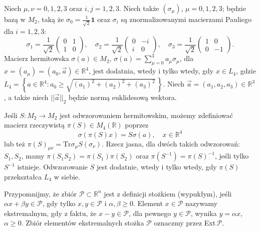 Niech $\mu,\nu = 0,1,2,3$ oraz $i,j = 1,2,3$.
Niech także $(\sigma_{\mu})$, $\mu = 0, 1, 2, 3$;
będzie bazą w  $M_{2}$, taką że
$\sigma_{0} = \tfrac{1}{\sqrt{2}}  \mathbf{1}$ oraz
$\sigma_{i}$
są znormalizowanymi macierzami Pauliego dla $i=1,2,3$:
\begin{equation}
 \sigma_{1} = \frac{1}{\sqrt{2}} \begin{pmatrix}
        0 & 1 \\ 1 & 0
           \end{pmatrix},
\quad
\sigma_{2} = \frac{1}{\sqrt{2}}  \begin{pmatrix}
        0 & -i \\ i & 0
           \end{pmatrix},
\quad
\sigma_{3} = \frac{1}{\sqrt{2}}  \begin{pmatrix}
        1 & 0 \\ 0 & -1
           \end{pmatrix}.
\end{equation}
Macierz hermitowska $\sigma(a) \in M_{2}$,
$\sigma(a) = \sum_{\mu =0}^{3} a_{\mu} \sigma_{\mu}$,
dla $x = (a_{\mu}) = (a_{0}, \vec{a}) \in \mathbb{R}^{4}$,
jest dodatnia, wtedy i tylko wtedy, gdy
$x \in L_{4}$,
gdzie
$ L_{4} = \left \{
            a \in \mathbb{R}^{4} :
            a_{0} \geq \sqrt{(a_{1})^{2} + (a_{2})^{2} + (a_{3})^{2}} \,
        \right \}$.
Niech $\vec{a} = (a_{1}, a_{2}, a_{3}) \in \mathbb{R}^{3}$,
a także niech $||\vec{a}||_{2}$ będzie normą euklidesową wektora.

Jeśli $S: M_{2} \rightarrow M_{2}$ jest odwzorowaniem hermitowskim,
możemy zdefiniować macierz rzeczywistą $\pi(S) \in M_{4}(\mathbb{R})$ poprzez
\begin{equation}
\label{def:PiofSiso}
  \sigma(\pi(S) x) = S \sigma(a), \quad x \in \mathbb{R}^{4}
\end{equation}
lub też $\pi(S)_{\mu \nu} = \text{Tr} \sigma_{\mu} S(\sigma_{\nu})$.
Rzecz jasna, dla dwóch takich odwzorowań: $S_{1}, S_{2}$, mamy
$\pi(S_{1} S_{2}) = \pi(S_{1}) \pi(S_{2})$
oraz $\pi(S^{-1}) = \pi(S)^{-1}$, jeśli tylko $S^{-1}$ istnieje.
Odwzorowanie $S$ jest dodatnie, wtedy i tylko wtedy, gdy
$\pi(S)$ przekształca $L_{4}$ w siebie.

Przypomnijmy, że zbiór $\mathcal{P} \subset \mathbb{R}^{n}$
jest z definicji stożkiem (wypukłym), jeśli
$\alpha x + \beta y \in \mathcal{P}$,
gdy tylko $x, y \in \mathcal{P}$ i $\alpha, \beta \geq 0$.
Element $x \in \mathcal{P}$ nazywamy ekstremalnym, gdy
z faktu, że $x - y \in \mathcal{P}$,
dla pewnego $y \in \mathcal{P}$,
wynika $y = \alpha x$, $\alpha \geq 0$.
Zbiór elementów ekstremalnych stożka $\mathcal{P}$ oznaczmy przez
Ext\,$\mathcal{P}$.

